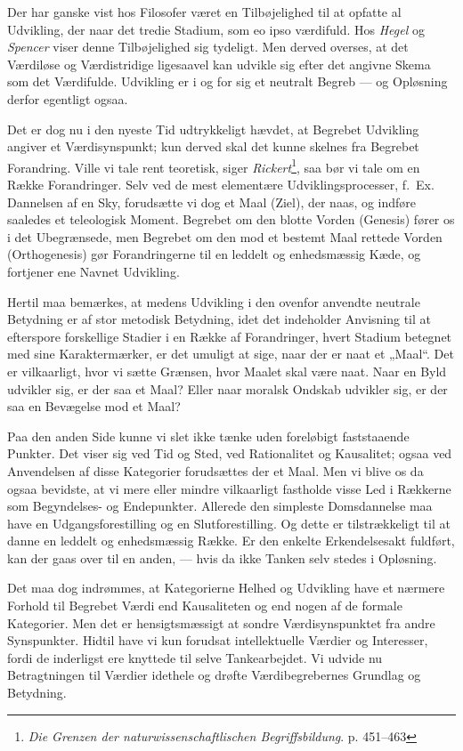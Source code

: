 \documentclass[12pt,a4paper]{book}
\newcommand{\apage}[1]{\marginnote{\footnotesize\textit{[#1]}}}
\begin{document}
Der har ganske vist hos Filosofer været en Tilbøjelighed til at opfatte al
Udvikling, der naar det tredie Stadium, som eo ipso værdifuld. Hos \emph{Hegel} og
\emph{Spencer} viser denne Tilbøjelighed sig tydeligt. Men derved overses, at det
Værdiløse og Værdistridige ligesaavel kan udvikle sig efter det angivne Skema som
det Værdifulde. Udvikling er i og for sig et neutralt Begreb --- og Opløsning
derfor egentligt ogsaa.

Det er dog nu i den nyeste Tid udtrykkeligt hævdet, at Begrebet Udvikling angiver
et Værdisynspunkt; kun derved skal det kunne skelnes fra Begrebet Forandring.
Ville vi tale rent teoretisk, siger \emph{Rickert}\footnote{\emph{Die Grenzen der
naturwissenschaftlischen Begriffsbildung}. p. 451--463}, saa bør vi tale om en
Række Forandringer. Selv ved de mest elementære Udviklingsprocesser, f.\ Ex.
Dannelsen af en Sky, forudsætte vi dog et Maal (Ziel), der naas, og indføre
saaledes et teleologisk Moment. Begrebet om den blotte Vorden (Genesis) fører os i
det Ubegrænsede, men Begrebet om den mod et bestemt Maal rettede Vorden
(Orthogenesis) gør Forandringerne til en leddelt og enhedsmæssig Kæde, og
fortjener ene Navnet Udvikling.

Hertil maa bemærkes, at medens Udvikling i den ovenfor anvendte neutrale Betydning
er af stor metodisk Betydning, idet det indeholder Anvisning til at efterspore
forskellige Stadier i en Række af Forandringer, hvert Stadium betegnet med sine
Karaktermærker, er det umuligt at sige, naar der er naat et „Maal“. Det er
vilkaarligt, hvor vi sætte Grænsen, hvor Maalet skal være naat. Naar en Byld
udvikler sig, er der saa et Maal? Eller naar moralsk Ondskab udvikler sig, er der
saa en Bevægelse mod et Maal?

Paa den anden Side kunne vi slet ikke tænke uden foreløbigt faststaaende Punkter.
Det viser sig ved Tid og Sted, ved Rationalitet og Kausalitet; ogsaa ved
Anvendelsen af \apage{237} disse Kategorier forudsættes der et Maal. Men vi blive os da ogsaa
bevidste, at vi mere eller mindre vilkaarligt fastholde visse Led i Rækkerne som
Begyndelses- og Endepunkter. Allerede den simpleste Domsdannelse maa have en
Udgangsforestilling og en Slutforestilling. Og dette er tilstrækkeligt til at
danne en leddelt og enhedsmæssig Række. Er den enkelte Erkendelsesakt fuldført,
kan der gaas over til en anden, --- hvis da ikke Tanken selv stedes i Opløsning.

Det maa dog indrømmes, at Kategorierne Helhed og Udvikling have et nærmere Forhold
til Begrebet Værdi end Kausaliteten og end nogen af de formale Kategorier. Men det
er hensigtsmæssigt at sondre Værdisynspunktet fra andre Synspunkter. Hidtil have
vi kun forudsat intellektuelle Værdier og Interesser, fordi de inderligst ere
knyttede til selve Tankearbejdet. Vi udvide nu Betragtningen til Værdier idethele
og drøfte Værdibegrebernes Grundlag og Betydning.
\end{document}
